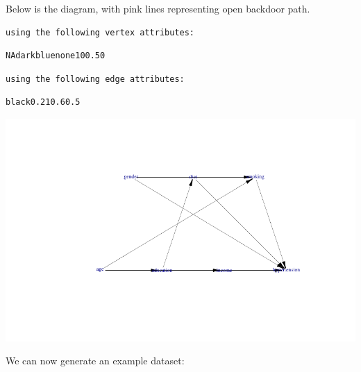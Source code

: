 \documentclass[
  letterpaper,
  DIV=11,
  numbers=noendperiod]{scrreprt}
\newenvironment{Shaded}{\begin{snugshade}}{\end{snugshade}}
\newcommand{\AttributeTok}[1]{\textcolor[rgb]{0.40,0.45,0.13}{#1}}
\newcommand{\DecValTok}[1]{\textcolor[rgb]{0.68,0.00,0.00}{#1}}
\newcommand{\FunctionTok}[1]{\textcolor[rgb]{0.28,0.35,0.67}{#1}}
\newcommand{\NormalTok}[1]{\textcolor[rgb]{0.00,0.23,0.31}{#1}}
\newcommand{\OtherTok}[1]{\textcolor[rgb]{0.00,0.23,0.31}{#1}}
\newcommand{\SpecialCharTok}[1]{\textcolor[rgb]{0.37,0.37,0.37}{#1}}
\newcommand{\StringTok}[1]{\textcolor[rgb]{0.13,0.47,0.30}{#1}}
\begin{document}
Below is the diagram, with pink lines representing open backdoor path.

\begin{verbatim}
using the following vertex attributes: 
\end{verbatim}

\begin{verbatim}
NAdarkbluenone100.50
\end{verbatim}

\begin{verbatim}
using the following edge attributes: 
\end{verbatim}

\begin{verbatim}
black0.210.60.5
\end{verbatim}

\includegraphics{chapter_07_files/figure-pdf/unnamed-chunk-4-1.pdf}

We can now generate an example dataset:

\begin{Shaded}
\end{Shaded}
\end{document}

